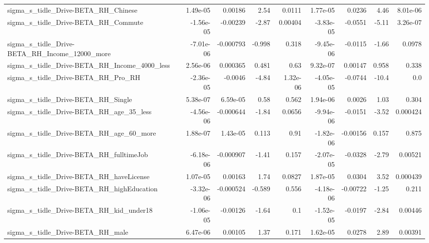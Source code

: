 \begin{tabular}{lrrrrrrrr}
sigma\_s\_tidle\_Drive-BETA\_RH\_Chinese                &    1.49e-05 &      0.00186 &      2.54 &   0.0111 &   1.77e-05 &      0.0236 &         4.46 &      8.01e-06 \\
sigma\_s\_tidle\_Drive-BETA\_RH\_Commute                &   -1.56e-05 &     -0.00239 &     -2.87 &  0.00404 &  -3.83e-05 &     -0.0551 &        -5.11 &      3.26e-07 \\
sigma\_s\_tidle\_Drive-BETA\_RH\_Income\_12000\_more      &   -7.01e-06 &    -0.000793 &    -0.998 &    0.318 &  -9.45e-06 &     -0.0115 &        -1.66 &        0.0978 \\
sigma\_s\_tidle\_Drive-BETA\_RH\_Income\_4000\_less       &    2.56e-06 &     0.000365 &     0.481 &     0.63 &   9.32e-07 &     0.00147 &        0.958 &         0.338 \\
sigma\_s\_tidle\_Drive-BETA\_RH\_Pro\_RH                 &   -2.36e-05 &      -0.0046 &     -4.84 & 1.32e-06 &  -4.05e-05 &     -0.0744 &        -10.4 &           0.0 \\
sigma\_s\_tidle\_Drive-BETA\_RH\_Single                 &    5.38e-07 &     6.59e-05 &      0.58 &    0.562 &   1.94e-06 &      0.0026 &         1.03 &         0.304 \\
sigma\_s\_tidle\_Drive-BETA\_RH\_age\_35\_less            &   -4.56e-06 &    -0.000644 &     -1.84 &   0.0656 &  -9.94e-06 &     -0.0151 &        -3.52 &      0.000424 \\
sigma\_s\_tidle\_Drive-BETA\_RH\_age\_60\_more            &    1.88e-07 &     1.43e-05 &     0.113 &     0.91 &  -1.82e-06 &    -0.00156 &        0.157 &         0.875 \\
sigma\_s\_tidle\_Drive-BETA\_RH\_fulltimeJob            &   -6.18e-06 &    -0.000907 &     -1.41 &    0.157 &  -2.07e-05 &     -0.0328 &        -2.79 &       0.00521 \\
sigma\_s\_tidle\_Drive-BETA\_RH\_haveLicense            &    1.07e-05 &      0.00163 &      1.74 &   0.0827 &   1.87e-05 &      0.0304 &         3.52 &      0.000439 \\
sigma\_s\_tidle\_Drive-BETA\_RH\_highEducation          &   -3.32e-06 &    -0.000524 &    -0.589 &    0.556 &  -4.18e-06 &    -0.00722 &        -1.25 &         0.211 \\
sigma\_s\_tidle\_Drive-BETA\_RH\_kid\_under18            &   -1.06e-05 &     -0.00126 &     -1.64 &      0.1 &  -1.52e-05 &     -0.0197 &        -2.84 &       0.00446 \\
sigma\_s\_tidle\_Drive-BETA\_RH\_male                   &    6.47e-06 &      0.00105 &      1.37 &    0.171 &   1.62e-05 &      0.0278 &         2.89 &       0.00391 \\

\end{tabular}
